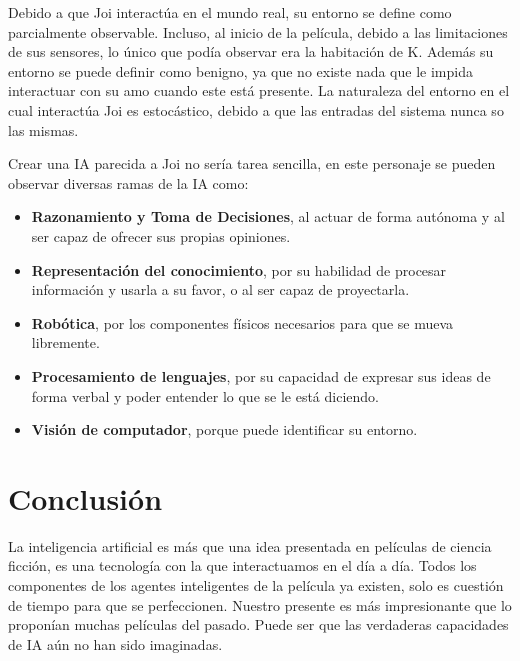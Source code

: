 \documentclass[]{scrreprt}
\begin{document}
Debido a que Joi interactúa en el mundo real, su entorno se define como parcialmente observable. Incluso, al inicio de la película, debido a las limitaciones de sus sensores, lo único que podía observar era la habitación de K.
Además su entorno se puede definir como benigno, ya que no existe nada que le impida interactuar con su amo cuando este está presente. La naturaleza del entorno en el cual interactúa Joi es estocástico, debido a que las entradas del sistema nunca so las mismas.

Crear una IA parecida a Joi no sería tarea sencilla, en este personaje se pueden observar diversas ramas de la IA como: 
\begin{itemize}
\item
\textbf{Razonamiento y Toma de Decisiones}, al actuar de forma autónoma y al ser capaz de ofrecer sus propias opiniones.
\item
\textbf{Representación del conocimiento}, por su habilidad de procesar información y usarla a su favor, o al ser capaz de proyectarla.
\item
\textbf{Robótica}, por los componentes físicos necesarios para que se mueva libremente.
\item
\textbf{Procesamiento de lenguajes}, por su capacidad de expresar sus ideas de forma verbal y poder entender lo que se le está diciendo.
\item
\textbf{Visión de computador}, porque puede identificar su entorno.
\end{itemize}

\section{Conclusión}
La inteligencia artificial es más que una idea presentada en películas de ciencia ficción, es una tecnología con la que interactuamos en el día a día. Todos los componentes de los agentes inteligentes de la película ya existen, solo es cuestión de tiempo para que se perfeccionen. Nuestro presente es más impresionante que lo proponían muchas películas del pasado. Puede ser que las verdaderas capacidades de IA aún no han sido imaginadas.
\end{document}
